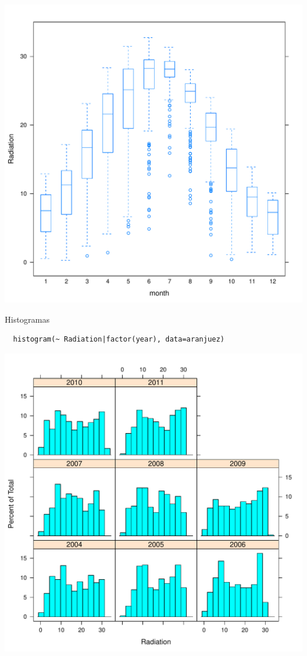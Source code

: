 \documentclass[xcolor={usenames,svgnames,dvipsnames}]{beamer}
\begin{document}
\begin{frame}[label=sec-6-1-13]{}
\includegraphics[width=.9\linewidth]{figs/bwplot.pdf}
\end{frame}

\begin{frame}[fragile,label=sec-6-1-14]{Histogramas}
 \lstset{language=R,label= ,caption= ,numbers=none}
\begin{lstlisting}
  histogram(~ Radiation|factor(year), data=aranjuez)
\end{lstlisting}
\end{frame}

\begin{frame}[label=sec-6-1-15]{}
\includegraphics[width=.9\linewidth]{figs/histogram.pdf}
\end{frame}
\end{document}
